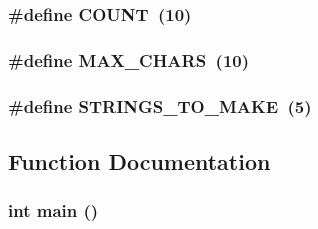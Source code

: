 \subsubsection{\setlength{\rightskip}{0pt plus 5cm}\#define COUNT~(10)}\label{part5_8c_698c124f1c293f98840449d6c5b9d984}


\subsubsection{\setlength{\rightskip}{0pt plus 5cm}\#define MAX\_\-CHARS~(10)}\label{part5_8c_8adbf2b1e0569dded992fee665e86e70}


\subsubsection{\setlength{\rightskip}{0pt plus 5cm}\#define STRINGS\_\-TO\_\-MAKE~(5)}\label{part5_8c_3d9da0647bb0d461f2656136d86e6371}




\subsection{Function Documentation}
\subsubsection{\setlength{\rightskip}{0pt plus 5cm}int main ()}\label{part5_8c_e66f6b31b5ad750f1fe042a706a4e3d4}


